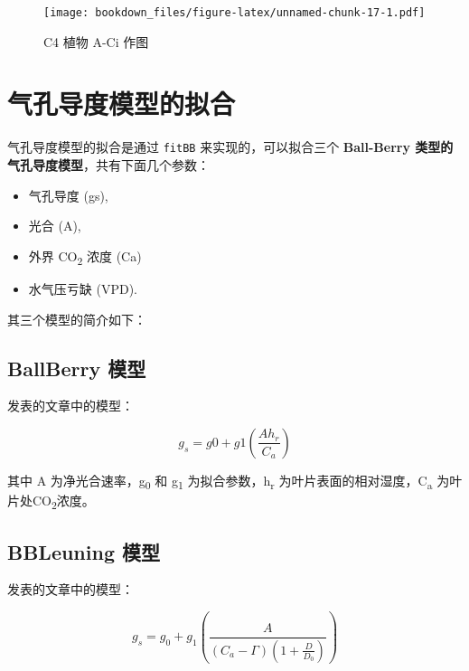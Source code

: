 \documentclass[
]{krantz}
\providecommand{\tightlist}{%
  \setlength{\itemsep}{0pt}\setlength{\parskip}{0pt}}
\begin{document}
\begin{figure}
\centering
\texttt{[image: bookdown\_files/figure-latex/unnamed-chunk-17-1.pdf]}
\caption{\label{fig:unnamed-chunk-17}C4 植物 A-Ci 作图}
\end{figure}

\cleardoublepage

\hypertarget{stomotal_sim}{%
\chapter{气孔导度模型的拟合}\label{stomotal_sim}}

气孔导度模型的拟合是通过 \texttt{fitBB} 来实现的，可以拟合三个 \textbf{Ball-Berry 类型的气孔导度模型}，共有下面几个参数：

\begin{itemize}
\tightlist
\item
  气孔导度 (gs),
\item
  光合 (A),
\item
  外界 CO\textsubscript{2} 浓度 (Ca)
\item
  水气压亏缺 (VPD).
\end{itemize}

其三个模型的简介如下：

\hypertarget{ballberry}{%
\section{BallBerry 模型}\label{ballberry}}

\citet{Ball1987A} 发表的文章中的模型：

\begin{equation}
g_s = g0 + g1(\frac{A h_r}{C_a})
\label{eq:ballberry}
\end{equation}

其中 A 为净光合速率，g\textsubscript{0} 和 g\textsubscript{1} 为拟合参数，h\textsubscript{r} 为叶片表面的相对湿度，C\textsubscript{a} 为叶片处CO\textsubscript{2}浓度。

\hypertarget{bbleuning}{%
\section{BBLeuning 模型}\label{bbleuning}}

\citet{leuning1995a} 发表的文章中的模型：

\begin{equation}
g_s = g_0 + g_1(\frac{A}{(C_a - \Gamma)(1 + \frac{D}{D_0})})
\label{eq:BBLeuning}
\end{equation}
\end{document}
